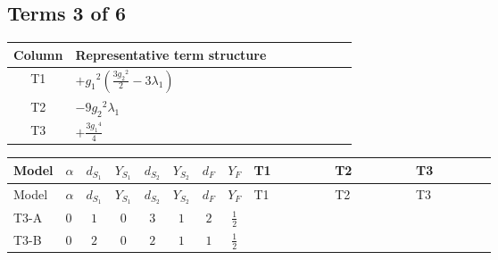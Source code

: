 \documentclass[8pt]{article}
\begin{document}
\begin{landscape}
\subsection*{Terms 3 of 6}
\begin{center}
\begin{tabular}{@{}c >{\raggedright\arraybackslash}p{0.82\linewidth}@{}}
\toprule
Column & Representative term structure \\
\midrule
T1 & \(\displaystyle +{g_1}^2 \left(\frac{3 {g_2}^2}{2}-3 {\lambda_1}\right)\) \\
\midrule
T2 & \(\displaystyle -9 {g_2}^2 {\lambda_1}\) \\
\midrule
T3 & \(\displaystyle +\frac{3 {g_1}^4}{4}\) \\
\midrule
\bottomrule
\end{tabular}
\end{center}
\smallskip
\tiny
\begin{longtable}{@{}llcccccc >{\raggedright\arraybackslash}p{0.21\linewidth} >{\raggedright\arraybackslash}p{0.21\linewidth} >{\raggedright\arraybackslash}p{0.21\linewidth}@{}}
\toprule
Model & $\alpha$ & $d_{S_1}$ & $Y_{S_1}$ & $d_{S_2}$ & $Y_{S_2}$ & $d_F$ & $Y_F$ & T1 & T2 & T3 \\
\midrule
\endfirsthead
\toprule
Model & $\alpha$ & $d_{S_1}$ & $Y_{S_1}$ & $d_{S_2}$ & $Y_{S_2}$ & $d_F$ & $Y_F$ & T1 & T2 & T3 \\
\midrule
\endhead
T3-A & $0$ & $1$ & $0$ & $3$ & $1$ & $2$ & $\frac{1}{2}$ & \scriptsize\adjustbox{max width=\linewidth}{$\begin{gathered} +{g_1}^2 \left(\frac{3 {g_2}^2}{2}-3 {\lambda_1}\right)\end{gathered}$} & \scriptsize\adjustbox{max width=\linewidth}{$\begin{gathered} -9 {g_2}^2 {\lambda_1}\end{gathered}$} & \scriptsize\adjustbox{max width=\linewidth}{$\begin{gathered} +\frac{3 {g_1}^4}{4}\end{gathered}$} \\
\midrule
T3-B & $0$ & $2$ & $0$ & $2$ & $1$ & $1$ & $\frac{1}{2}$ & \scriptsize\adjustbox{max width=\linewidth}{$\begin{gathered} +{g_1}^2 \left(\frac{3 {g_2}^2}{2}-3 {\lambda_1}\right)\end{gathered}$} & \scriptsize\adjustbox{max width=\linewidth}{$\begin{gathered} -9 {g_2}^2 {\lambda_1}\end{gathered}$} & \scriptsize\adjustbox{max width=\linewidth}{$\begin{gathered} +\frac{3 {g_1}^4}{4}\end{gathered}$} \\

\end{longtable}
\end{landscape}
\end{document}
